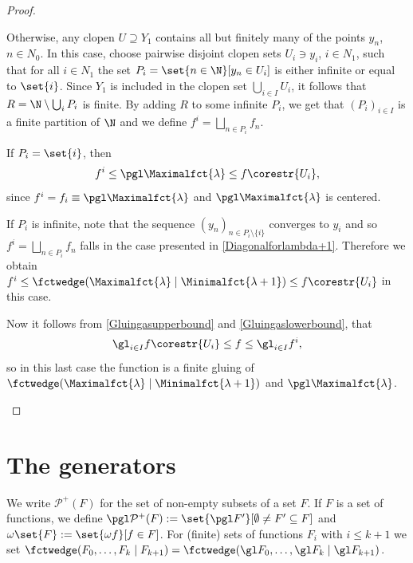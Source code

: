 \begin{proof}
\begin{descThm}
Otherwise, any clopen $U\supseteq Y_1$ contains all but finitely many of the points $y_n$, $n\in N_0$.  
In this case, choose pairwise disjoint clopen sets $U_i\ni y_i$, $i\in N_1$, such that for all $i\in N_1$ the set $P_i=\set{n\in \N }[y_n\in U_i]$ is either infinite or equal to $\set{i}$. 
Since $Y_1$ is included in the clopen set $\bigcup_{i\in I}U_i$, it follows that $R=\N\setminus \bigcup_i P_i$ is finite. By adding $R$ to some infinite $P_i$, we get that $(P_i)_{i\in I}$ is a finite partition of $\N$ and we define $f^{i}=\bigsqcup_{n\in P_i} f_n$.

If $P_i=\set{i}$, then 
\[f^{i}\leq \pgl\Maximalfct{\lambda} \leq f\corestr{U_i},\]
since $f^{i}=f_i\equiv \pgl\Maximalfct{\lambda}$ and $\pgl\Maximalfct{\lambda}$ is centered.

If $P_i$ is infinite, note that the sequence $(y_n)_{n\in P_i\setminus \{i\}}$ converges to $y_i$ and so $f^{i}=\bigsqcup_{n\in P_i} f_n$ falls in the case presented in \cref{Diagonalforlambda+1}. Therefore we obtain $f^{i}\leq \fctwedge(\Maximalfct{\lambda}\mid\Minimalfct{\lambda+1}) \leq f\corestr{U_i}$ in this case.



Now it follows from \cref{Gluingasupperbound} and \cref{Gluingaslowerbound}, that
\[\gl_{i\in I}f\corestr{U_i}\leq f\leq\gl_{i\in I}f^i,\]
so in this last case the function is a finite gluing of $ \fctwedge(\Maximalfct{\lambda}\mid\Minimalfct{\lambda+1})$ and $\pgl\Maximalfct{\lambda}$.
\end{descThm}
\end{proof}


\section{The generators}\label{subsectionGenerators}

We write $ \mathcal{P}^+(F)$ for the set of non-empty subsets of a set $F$.
If $F$ is a set of functions, we define $\pgl\mathcal{P}^+(F):=\set{\pgl F'}[\emptyset\neq F'\subseteq F]$ and $\omega\set{F}:=\set{\omega f}[f\in F]$.
For (finite) sets of functions $F_i$ with $i\leq k+1$ we set $\fctwedge(F_0,\ldots,F_k\mid F_{k+1})=\fctwedge(\gl F_0,\ldots,\gl F_k\mid \gl F_{k+1})$.

